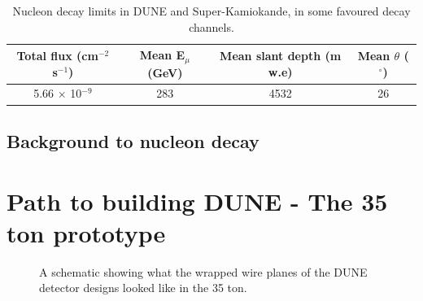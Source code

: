\begin{table}[h!]
\caption[Nucleon decay limits in DUNE and Super-Kamiokande]
        {Nucleon decay limits in DUNE and Super-Kamiokande, in some favoured decay channels.}
\centering
\label{tab:NDKLim}
\begin{tabular}{c c c c}
\toprule
{Total flux (cm$^{-2}$ s$^{-1}$)} & {Mean E$_{\mu}$ (GeV)} & {Mean slant depth (m w.e)} & {Mean $\theta$ ($^{\circ}$)} \\ 
\midrule
5.66 $\times$ 10$^{-9}$           & 283                    & 4532                       & 26                           \\
\bottomrule
\end{tabular}
\end{table}

\subsection{Background to nucleon decay} \label{sec:BkNDK}  %

\section{Path to building DUNE - The 35 ton prototype} \label{sec:The35tonDetector}  %

\begin{figure}[h]
  \centering
  \caption[The wrapped wires of the 35 ton]{A schematic showing what the wrapped wire planes of the DUNE detector designs looked like in the 35 ton.}
  \label{fig:35tonWireGeom}
\end{figure}

